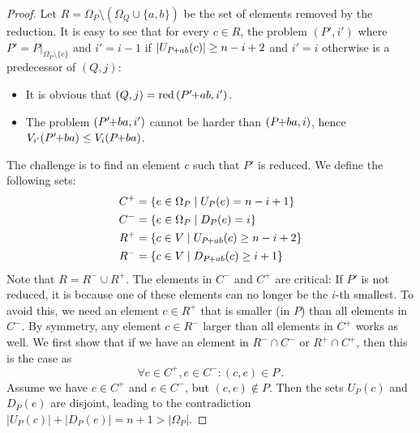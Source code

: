 \documentclass[a4paper,UKenglish,cleveref, autoref, thm-restate]{lipics-v2021}
\newcommand{\pchild}[3]{{#1}\kern-1pt{+}{#2}{#3}}
\newcommand{\reduced}[1]{\operatorname{red}{#1}}
\newcommand{\less}[2]{D_{#1}(#2)}
\newcommand{\greater}[2]{U_{#1}(#2)}
\begin{document}
\begin{proof}
  Let $R = \Omega_P \setminus (\Omega_Q \cup \{a, b\})$ be the set of elements removed by the reduction.
  It is easy to see that for every $c \in R$, the problem $(P', i')$ where $P' = P|_{\Omega_P \setminus \{c\}}$ and $i' = i - 1$ if $|\greater{\pchild{P}{a}{b}}{c}| \ge n - i + 2$ and $i' = i$ otherwise is a predecessor of $(Q, j)$:
  \begin{itemize}
    \item It is obvious that $(Q, j) = \reduced{(\pchild{P'}{a}{b}, i')}$.
    \item The problem $(\pchild{P'}{b}{a}, i')$ cannot be harder than $(\pchild{P}{b}{a}, i)$, hence $V_{i'}(\pchild{P'}{b}{a}) \leq V_i(\pchild{P}{b}{a})$.
  \end{itemize}
  The challenge is to find an element $c$ such that $P'$ is reduced.
  We define the following sets:
  \begin{align*}
    C^+ & = \{e \in \Omega_P \mid \greater{P}{e} = n - i + 1\}            \\
    C^- & = \{e \in \Omega_P \mid \less{P}{e} = i \}                      \\
    R^+ & = \{c \in V \mid \greater{\pchild{P}{a}{b}}{c} \ge n - i + 2 \} \\
    R^- & = \{c \in V \mid \less{\pchild{P}{a}{b}}{c} \ge i + 1 \}
  \end{align*}
  Note that $R = R^- \cup R^+$.
  The elements in $C^-$ and $C^+$ are critical:
  If $P'$ is not reduced, it is because one of these elements can no longer be the $i$-th smallest.
  To avoid this, we need an element $c \in R^+$ that is smaller (in $P$) than all elements in $C^-$.
  By symmetry, any element $c \in R^-$ larger than all elements in $C^+$ works as well.
  We first show that if we have an element in $R^- \cap C^-$ or $R^+ \cap C^+$, then this is the case as
  \begin{equation}
    \forall c \in C^+, e \in C^- \colon (c, e) \in P\,\text{.}
  \end{equation}
  Assume we have $c \in C^+$ and $e \in C^-$, but $(c, e) \notin P$.
  Then the sets $\greater{P}{c}$ and $\less{P}{e}$ are disjoint, leading to the contradiction $|\greater{P}{c}| + |\less{P}{e}| = n + 1 > |\Omega_P|$.


\end{proof}
\end{document}
